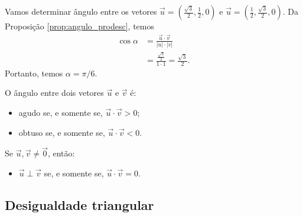 \begin{ex}
  Vamos determinar ângulo entre os vetores $\displaystyle \vec{u}=\left(\frac{\sqrt{3}}{2},\frac{1}{2},0\right)$ e $\displaystyle \vec{u}=\left(\frac{1}{2},\frac{\sqrt{3}}{2},0\right)$. Da Proposição \ref{prop:angulo_prodesc}, temos
  \begin{align}
    \cos\alpha &= \frac{\vec{u}\cdot\vec{v}}{|u|\cdot|v|}\\
               &= \frac{\frac{\sqrt{3}}{2}}{1\cdot 1} = \frac{\sqrt{3}}{2}.
  \end{align}
  Portanto, temos $\alpha = \pi/6$.
\end{ex}

\begin{obs}
  O ângulo entre dois vetores $\vec{u}$ e $\vec{v}$ é:
  \begin{itemize}
  \item agudo se, e somente se, $\vec{u}\cdot\vec{v} > 0$;
  \item obtuso se, e somente se, $\vec{u}\cdot\vec{v} < 0$.
  \end{itemize}
  Se $\vec{u},\vec{v}\neq\vec{0}$, então:
  \begin{itemize}
  \item $\vec{u}\perp\vec{v}$ se, e somente se, $\vec{u}\cdot\vec{v}=0$.
  \end{itemize}
\end{obs}

\subsection{Desigualdade triangular}

